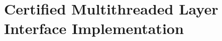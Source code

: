 \clearpage


\section{Certified Multithreaded Layer Interface Implementation}
\label{sec:multithreaded-linking-impl}

%    
%      
%      
%      
%
%      
